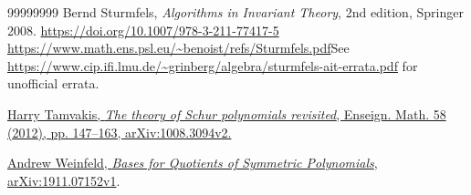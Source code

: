 \documentclass[numbers=enddot,12pt,final,onecolumn,notitlepage]{scrartcl}%
\theoremstyle{definition}
\begin{document}
\begin{thebibliography}{99999999}
Bernd Sturmfels, \textit{Algorithms in Invariant
Theory}, 2nd edition, Springer 2008.\newline%
\url{https://doi.org/10.1007/978-3-211-77417-5}\newline%
\url{https://www.math.ens.psl.eu/~benoist/refs/Sturmfels.pdf}\newline See
\url{https://www.cip.ifi.lmu.de/~grinberg/algebra/sturmfels-ait-errata.pdf}
for unofficial errata.

\href{https://arxiv.org/abs/1008.3094v2}{Harry
Tamvakis, \textit{The theory of Schur polynomials revisited}, Enseign. Math.
58 (2012), pp. 147--163, arXiv:1008.3094v2.}

\href{https://arxiv.org/abs/1911.07152v1}{Andrew
Weinfeld, \textit{Bases for Quotients of Symmetric Polynomials},
arXiv:1911.07152v1}.
\end{thebibliography}
\end{document}

